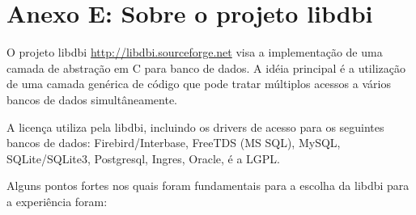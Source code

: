 % 
% 
% 
% 

\section{Anexo E: Sobre o projeto libdbi} \label{sec:anexog}

O projeto libdbi \url{http://libdbi.sourceforge.net} visa a implementação de uma camada de abstração em C para banco de dados. A idéia principal é a utilização de uma camada genérica de código que pode tratar múltiplos acessos a vários bancos de dados simultâneamente. 

A licença utiliza pela libdbi, incluindo os drivers de acesso para os seguintes bancos de dados: Firebird/Interbase, FreeTDS (MS SQL), MySQL, SQLite/SQLite3, Postgresql, Ingres, Oracle, é a LGPL.

Alguns pontos fortes nos quais foram fundamentais para a escolha da libdbi para a experiência foram: 

